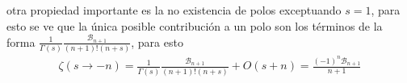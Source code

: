 otra propiedad importante es la no existencia de polos exceptuando $s=1$, para esto se ve que la única posible contribución a un polo son los términos de la forma  $	\frac{1}{\Gamma (s)} \frac{ \mathcal{B} _{n+1}}{ (n+1)! (n + s)}$, para esto 
\begin{align}
	\zeta ( s \rightarrow -n ) = 
	\frac{1}{\Gamma (s)}
	\frac{ \mathcal{B} _{n+1}}{ (n+1)! (n + s)}
	+ O (s + n) = 
	\frac{(-1) ^n \mathcal{B} _{n+1}}
		{n+1}
\end{align}






















